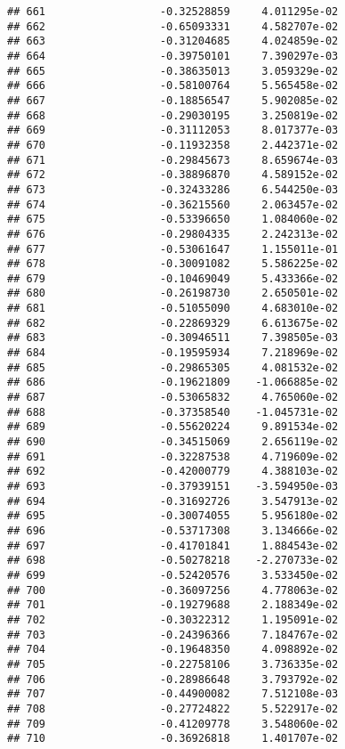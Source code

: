 \documentclass[
]{article}
\begin{document}
\begin{verbatim}
## 661                  -0.32528859     4.011295e-02
## 662                  -0.65093331     4.582707e-02
## 663                  -0.31204685     4.024859e-02
## 664                  -0.39750101     7.390297e-03
## 665                  -0.38635013     3.059329e-02
## 666                  -0.58100764     5.565458e-02
## 667                  -0.18856547     5.902085e-02
## 668                  -0.29030195     3.250819e-02
## 669                  -0.31112053     8.017377e-03
## 670                  -0.11932358     2.442371e-02
## 671                  -0.29845673     8.659674e-03
## 672                  -0.38896870     4.589152e-02
## 673                  -0.32433286     6.544250e-03
## 674                  -0.36215560     2.063457e-02
## 675                  -0.53396650     1.084060e-02
## 676                  -0.29804335     2.242313e-02
## 677                  -0.53061647     1.155011e-01
## 678                  -0.30091082     5.586225e-02
## 679                  -0.10469049     5.433366e-02
## 680                  -0.26198730     2.650501e-02
## 681                  -0.51055090     4.683010e-02
## 682                  -0.22869329     6.613675e-02
## 683                  -0.30946511     7.398505e-03
## 684                  -0.19595934     7.218969e-02
## 685                  -0.29865305     4.081532e-02
## 686                  -0.19621809    -1.066885e-02
## 687                  -0.53065832     4.765060e-02
## 688                  -0.37358540    -1.045731e-02
## 689                  -0.55620224     9.891534e-02
## 690                  -0.34515069     2.656119e-02
## 691                  -0.32287538     4.719609e-02
## 692                  -0.42000779     4.388103e-02
## 693                  -0.37939151    -3.594950e-03
## 694                  -0.31692726     3.547913e-02
## 695                  -0.30074055     5.956180e-02
## 696                  -0.53717308     3.134666e-02
## 697                  -0.41701841     1.884543e-02
## 698                  -0.50278218    -2.270733e-02
## 699                  -0.52420576     3.533450e-02
## 700                  -0.36097256     4.778063e-02
## 701                  -0.19279688     2.188349e-02
## 702                  -0.30322312     1.195091e-02
## 703                  -0.24396366     7.184767e-02
## 704                  -0.19648350     4.098892e-02
## 705                  -0.22758106     3.736335e-02
## 706                  -0.28986648     3.793792e-02
## 707                  -0.44900082     7.512108e-03
## 708                  -0.27724822     5.522917e-02
## 709                  -0.41209778     3.548060e-02
## 710                  -0.36926818     1.401707e-02

\end{verbatim}
\end{document}
